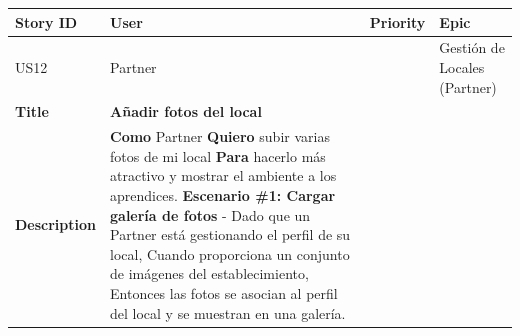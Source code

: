 {\def\LTcaptype{none} %
\begin{longtable}[]{@{}
  >{\raggedright\arraybackslash}p{}
  >{\raggedright\arraybackslash}p{}
  >{\raggedright\arraybackslash}p{}
  >{\raggedright\arraybackslash}p{}@{}}
\toprule\noalign{}
\begin{minipage}[b]{\linewidth}\raggedright
Story ID
\end{minipage} & \begin{minipage}[b]{\linewidth}\raggedright
User
\end{minipage} & \begin{minipage}[b]{\linewidth}\raggedright
Priority
\end{minipage} & \begin{minipage}[b]{\linewidth}\raggedright
Epic
\end{minipage} \\
\midrule\noalign{}
\endhead
\bottomrule\noalign{}
\endlastfoot
US12 & Partner & 3 & Gestión de Locales (Partner) \\
\textbf{Title} & \textbf{Añadir fotos del local} & & \\
\textbf{Description} & \textbf{Como} Partner \textbf{Quiero} subir
varias fotos de mi local \textbf{Para} hacerlo más atractivo y mostrar
el ambiente a los aprendices. \textbf{Escenario \#1: Cargar galería de
fotos} - Dado que un Partner está gestionando el perfil de su local,
Cuando proporciona un conjunto de imágenes del establecimiento, Entonces
las fotos se asocian al perfil del local y se muestran en una galería. &
& \\
\end{longtable}
}

